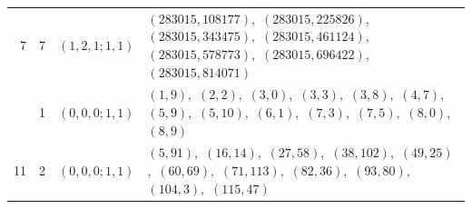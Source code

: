 \documentclass[11pt]{article}
\begin{document}
\begin{longtable}{@{}rrl>{\raggedright\arraybackslash}p{}@{}}
7 & 7 & $(1,2,1;1,1)$ & $(283015,108177)$,\allowbreak\ $(283015,225826)$,\allowbreak\ $(283015,343475)$,\allowbreak\ $(283015,461124)$,\allowbreak\ $(283015,578773)$,\allowbreak\ $(283015,696422)$,\allowbreak\ $(283015,814071)$\\
\addlinespace[3pt]
11 & 1 & $(0,0,0;1,1)$ & $(1,9)$,\allowbreak\ $(2,2)$,\allowbreak\ $(3,0)$,\allowbreak\ $(3,3)$,\allowbreak\ $(3,8)$,\allowbreak\ $(4,7)$,\allowbreak\ $(5,9)$,\allowbreak\ $(5,10)$,\allowbreak\ $(6,1)$,\allowbreak\ $(7,3)$,\allowbreak\ $(7,5)$,\allowbreak\ $(8,0)$,\allowbreak\ $(8,9)$\\
11 & 2 & $(0,0,0;1,1)$ & $(5,91)$,\allowbreak\ $(16,14)$,\allowbreak\ $(27,58)$,\allowbreak\ $(38,102)$,\allowbreak\ $(49,25)$,\allowbreak\ $(60,69)$,\allowbreak\ $(71,113)$,\allowbreak\ $(82,36)$,\allowbreak\ $(93,80)$,\allowbreak\ $(104,3)$,\allowbreak\ $(115,47)$\\

\end{longtable}
\end{document}
